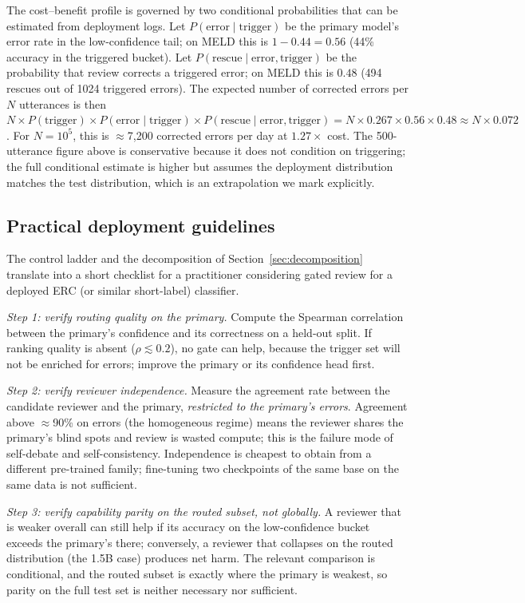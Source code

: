 \documentclass[final,5p,times,twocolumn]{elsarticle}
\begin{document}
The cost--benefit profile is governed by two conditional probabilities that
can be estimated from deployment logs. Let $P(\text{error}\mid\text{trigger})$
be the primary model's error rate in the low-confidence tail; on MELD this
is $1 - 0.44 = 0.56$ (44\% accuracy in the triggered bucket). Let
$P(\text{rescue}\mid\text{error}, \text{trigger})$ be the probability that
review corrects a triggered error; on MELD this is $0.48$ (494 rescues out
of 1024 triggered errors). The expected number of corrected errors per
$N$ utterances is then $N \times P(\text{trigger}) \times P(\text{error}\mid\text{trigger})
\times P(\text{rescue}\mid\text{error}, \text{trigger}) = N \times 0.267
\times 0.56 \times 0.48 \approx N \times 0.072$. For $N{=}10^5$, this is
$\approx$7{,}200 corrected errors per day at $1.27\times$ cost. The
500-utterance figure above is conservative because it does not condition on
triggering; the full conditional estimate is higher but assumes the
deployment distribution matches the test distribution, which is an
extrapolation we mark explicitly.

\subsection{Practical deployment guidelines}
\label{sec:guidelines}
The control ladder and the decomposition of Section~\ref{sec:decomposition}
translate into a short checklist for a practitioner considering gated review
for a deployed ERC (or similar short-label) classifier.

\emph{Step 1: verify routing quality on the primary.} Compute the
Spearman correlation between the primary's confidence and its correctness
on a held-out split. If ranking quality is absent ($\rho\lesssim0.2$), no
gate can help, because the trigger set will not be enriched for errors;
improve the primary or its confidence head first.

\emph{Step 2: verify reviewer independence.} Measure the agreement rate
between the candidate reviewer and the primary, \emph{restricted to the
primary's errors}. Agreement above $\approx$90\% on errors (the homogeneous
regime) means the reviewer shares the primary's blind spots and review is
wasted compute; this is the failure mode of self-debate and
self-consistency. Independence is cheapest to obtain from a different
pre-trained family; fine-tuning two checkpoints of the same base on the
same data is not sufficient.

\emph{Step 3: verify capability parity on the routed subset, not globally.}
A reviewer that is weaker overall can still help if its accuracy on the
low-confidence bucket exceeds the primary's there; conversely, a reviewer
that collapses on the routed distribution (the 1.5B case) produces net
harm. The relevant comparison is conditional, and the routed subset is
exactly where the primary is weakest, so parity on the full test set is
neither necessary nor sufficient.
\end{document}

